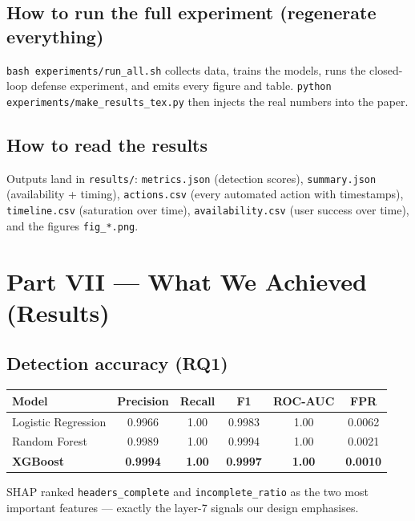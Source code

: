 \documentclass[11pt,a4paper]{article}
\begin{document}
\subsection{How to run the full experiment (regenerate everything)}
\texttt{bash experiments/run\_all.sh} collects data, trains the models, runs the
closed-loop defense experiment, and emits every figure and table.
\texttt{python experiments/make\_results\_tex.py} then injects the real numbers
into the paper.

\subsection{How to read the results}
Outputs land in \texttt{results/}: \texttt{metrics.json} (detection scores),
\texttt{summary.json} (availability + timing), \texttt{actions.csv} (every
automated action with timestamps), \texttt{timeline.csv} (saturation over time),
\texttt{availability.csv} (user success over time), and the figures
\texttt{fig\_*.png}.

\section{Part VII --- What We Achieved (Results)}

\subsection{Detection accuracy (RQ1)}
\begin{center}
\begin{tabular}{lccccc}
\toprule
Model & Precision & Recall & F1 & ROC-AUC & FPR \\
\midrule
Logistic Regression & 0.9966 & 1.00 & 0.9983 & 1.00 & 0.0062 \\
Random Forest & 0.9989 & 1.00 & 0.9994 & 1.00 & 0.0021 \\
\textbf{XGBoost} & \textbf{0.9994} & \textbf{1.00} & \textbf{0.9997} & \textbf{1.00} & \textbf{0.0010} \\
\bottomrule
\end{tabular}
\end{center}
SHAP ranked \texttt{headers\_complete} and \texttt{incomplete\_ratio} as the two
most important features --- exactly the layer-7 signals our design emphasises.
\end{document}
